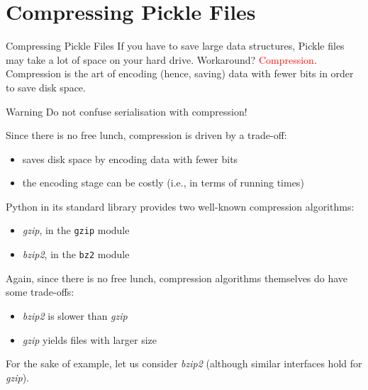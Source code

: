 \documentclass[t,handout,9pt]{beamer}
\begin{document}
\section{Compressing Pickle Files}
\begin{frame}{Compressing Pickle Files}
\vfill
If you have to save large data structures, Pickle files may take a lot of space on your hard drive.
\vfill
Workaround? \textcolor{red}{Compression}.
\vfill
Compression is the art of encoding (hence, saving) data with fewer bits in order to save disk space.
\begin{block}{Warning}
Do not confuse serialisation with compression!
\end{block}
\vfill
Since there is no free lunch, compression is driven by a trade-off:
\begin{itemize}
	\item saves disk space by encoding data with fewer bits
	\item the encoding stage can be costly (i.e., in terms of running times)
\end{itemize}
\vfill
\end{frame}
%
\begin{frame}
\vfill
Python in its standard library provides two well-known compression algorithms:
\begin{itemize}
	\item \textit{gzip}, in the \texttt{gzip} module
	\item \textit{bzip2}, in the \texttt{bz2} module
\end{itemize}
\vfill
Again, since there is no free lunch, compression algorithms themselves do have some trade-offs:
\begin{itemize}
	\item \textit{bzip2} is slower than \textit{gzip}
	\item \textit{gzip} yields files with larger size
\end{itemize}
\vfill
For the sake of example, let us consider \textit{bzip2} (although similar interfaces hold for \textit{gzip}).
\vfill
\end{frame}
%
\end{document}
